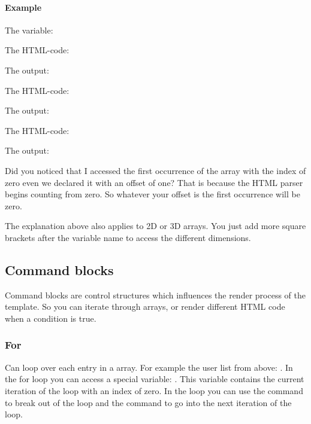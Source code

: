 \documentclass[letterpaper,10pt,english]{sphinxmanual}
\begin{document}
\paragraph{Example}
\label{\detokenize{html-parser:example}}\label{\detokenize{html-parser:array-example}}
The variable: 

The HTML-code: 

The output: 

The HTML-code: 

The output: 

The HTML-code: 

The output: 

Did you noticed that I accessed the first occurrence of the array with the index of zero even we declared it with an offset of one? That is because the HTML parser begins counting from zero. So whatever your offset is the first occurrence will be zero.

The explanation above also applies to 2D or 3D arrays. You just add more square brackets after the variable name to access the different dimensions.


\subsection{Command blocks}
\label{\detokenize{html-parser:command-blocks}}
Command blocks are control structures which influences the render process of the template. So you can iterate through arrays, or render different HTML code when a condition is true.


\subsubsection{For}
\label{\detokenize{html-parser:for}}
Can loop over each entry in a array. For example the user list from above: {\hyperref[\detokenize{html-parser:template-example}]{}}. In the for loop you can access a special variable: . This variable contains the current iteration of the loop with an index of zero. In the loop you can use the  command to break out of the loop and the  command to go into the next iteration of the loop.
\end{document}
